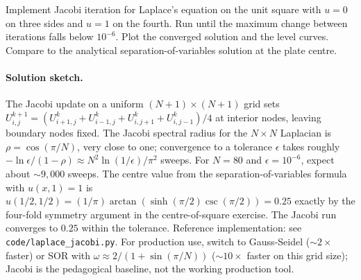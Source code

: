 \begin{exercise}
Implement Jacobi iteration for Laplace's equation on the unit
square with $u = 0$ on three sides and $u = 1$ on the fourth.
Run until the maximum change between iterations falls below
$10^{-6}$. Plot the converged solution and the level curves.
Compare to the analytical separation-of-variables solution at the
plate centre.

\paragraph{Solution sketch.}
The Jacobi update on a uniform $(N+1) \times (N+1)$ grid sets
$U_{i, j}^{k+1} = (U_{i+1, j}^{k} + U_{i-1, j}^{k} + U_{i, j+1}^{k}
+ U_{i, j-1}^{k})/4$ at interior nodes, leaving boundary nodes
fixed. The Jacobi spectral radius for the $N \times N$ Laplacian
is $\rho = \cos(\pi/N)$, very close to one; convergence to a
tolerance $\epsilon$ takes roughly $-\ln\epsilon / (1 - \rho)
\approx N^{2} \ln(1/\epsilon)/\pi^{2}$ sweeps. For $N = 80$ and
$\epsilon = 10^{-6}$, expect about $\sim 9{,}000$ sweeps. The
centre value from the separation-of-variables formula with
$u(x, 1) = 1$ is $u(1/2, 1/2) = (1/\pi)\arctan(\sinh(\pi/2)
\csc(\pi/2)) = 0.25$ exactly by the four-fold symmetry argument
in the centre-of-square exercise. The Jacobi run converges to
$0.25$ within the tolerance. Reference implementation: see
\texttt{code/laplace\_jacobi.py}. For production use, switch to
Gauss-Seidel ($\sim 2 \times$ faster) or SOR with
$\omega \approx 2/(1 + \sin(\pi/N))$ ($\sim 10 \times$ faster on
this grid size); Jacobi is the pedagogical baseline, not the
working production tool.
\end{exercise}

